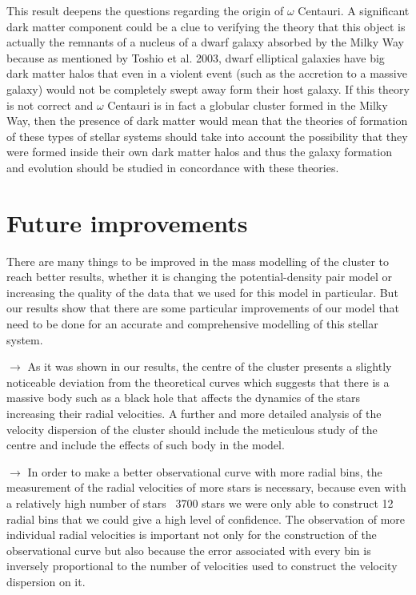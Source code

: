 This result deepens the questions regarding the origin of $\omega$ Centauri. A significant dark matter component could be a clue to verifying the theory that this object is actually the remnants of a nucleus of a dwarf galaxy absorbed by the Milky Way because as mentioned by Toshio et al. 2003, dwarf elliptical galaxies have big dark matter halos that even in a violent event (such as the accretion to a massive galaxy) would not be completely swept away form their host galaxy. If this theory is not correct and $\omega$ Centauri is in fact a globular cluster formed in the Milky Way, then the presence of dark matter would mean that the theories of formation of these types of stellar systems should take into account the possibility that they were formed inside their own dark matter halos and thus the galaxy formation and evolution should be studied in concordance with these theories. 

\section{Future improvements}

There are many things to be improved in the mass modelling of the cluster to reach better results, whether it is changing the potential-density pair model or increasing the quality of the data that we used for this model in particular. But our results show that there are some particular improvements of our model that need to be done for an accurate and comprehensive modelling of this stellar system.

$\rightarrow$ As it was shown in our results, the centre of the cluster presents a slightly noticeable deviation from the theoretical curves which suggests that there is a massive body such as a black hole that affects the dynamics of the stars increasing their radial velocities. A further and more detailed analysis of the velocity dispersion of the cluster should include the meticulous study of the centre and include the effects of such body in the model.

$\rightarrow$ In order to make a better observational curve with more radial bins, the measurement of the radial velocities of more stars is necessary, because even with a relatively high number of stars ~3700 stars we were only able to construct 12 radial bins that we could give a high level of confidence. The observation of more individual radial velocities is important not only for the construction of the observational curve but also because the error associated with every bin is inversely proportional to the number of velocities used to construct the velocity dispersion on it. 


